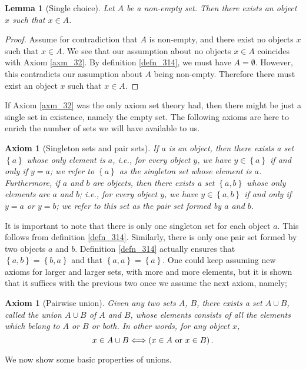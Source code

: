 \documentclass[a4paper, twocolumn]{report}
\newcounter{dummy} \numberwithin{dummy}{section}
\newcounter{axmcntr} \numberwithin{axmcntr}{chapter}
\newtheorem{axm}[axmcntr]{Axiom}
\newtheorem{lma}[dummy]{Lemma}
\theoremstyle{definition}
\theoremstyle{solution}
\newcommand{\union}{\cup}
\begin{document}
\begin{lma}[Single choice]
  \label{lma_316}
  Let $A$ be a non-empty set. Then there exists an object $x$ such that $x \in
  A$.  
\end{lma}

\begin{proof}
  Assume for contradiction that $A$ is non-empty, and there exist no objects
  $x$ such that $x \in A$.  We see that our assumption about no objects $x \in
  A$ coincides with Axiom \ref{axm_32}.  By definition
  \ref{defn_314}, we must have $A = \emptyset$. However, this contradicts our
  assumption about $A$ being non-empty. Therefore there must exist an object
  $x$ such that $x \in A$. 
\end{proof}

If Axiom \ref{axm_32} was the only axiom set theory had, then there might be
just a single set in existence, namely the empty set. The following axioms are
here to enrich the number of sets we will have available to us. 

\begin{axm}[Singleton sets and pair sets]
  \label{axm_33}
  If $a$ is an object, then there exists a set $\left\{ a \right\}$ whose only
  element is $a$, i.e., for every object $y$, we have $y \in \left\{ a
  \right\}$ if and only if $y = a$; we refer to $\left\{ a \right\}$ as the
  \textrm{singleton set} whose element is $a$.  Furthermore, if $a$ and $b$ are
  objects, then there exists a set $\left\{ a, b \right\}$ whose only elements
  are $a$ and $b$; i.e., for every object $y$, we have $y \in \left\{ a, b
  \right\}$ if and only if $y = a$ or $y = b$; we refer to this set as the
  \textrm{pair set} formed by $a$ and $b$. 
\end{axm}
\addtocounter{dummy}{4}

It is important to note that there is only one singleton set for each object
$a$. This follows from definition \ref{defn_314}. Similarly, there is only one
pair set formed by two objects $a$ and $b$. Definition \ref{defn_314} actually
ensures that $\left\{ a, b \right\} = \left\{ b, a \right\}$ and that $\left\{
a, a \right\} = \left\{ a \right\}$. One could keep assuming new axioms for larger and larger sets, with more and
more elements, but it is shown that it suffices with the previous two once we assume the next axiom, namely;
\begin{axm}[Pairwise union]
  \label{axm_34}
  Given any two sets $A$, $B$, there exists a set $A \union B$, called the \textit{union} $A \union B$ of $A$ and $B$, whose elements
  consists of all the elements which belong to $A$ or $B$ or both. In other words, for any object $x$,
  \begin{equation}
    \notag
    x \in A \union B \Longleftrightarrow \left( x \in A \text{ or } x \in B\right).
  \end{equation}
\end{axm}
\addtocounter{dummy}{2}
We now show some basic properties of unions.
\end{document}

